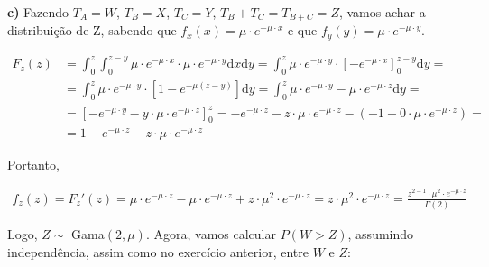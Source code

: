 \documentclass[12pt,letterpaper]{article}
\begin{document}
	\textbf{c)} Fazendo $T_A = W$, $T_B = X$, $T_C = Y$, $T_B+T_C=T_{B+C} = Z$, vamos achar a distribuição de Z, sabendo que $f_x(x) = \mu \cdot e^{-\mu \cdot x}$ e que $f_y(y) = \mu \cdot e^{-\mu \cdot y}$.
	
	\begin{equation*}
		\begin{split}
			F_z(z) & = \int_{0}^{z} \int_{0}^{z-y} \mu \cdot e^{-\mu \cdot x} \cdot \mu \cdot e^{-\mu \cdot y} \text{d}x \text{d}y = \int_{0}^{z}  \mu \cdot e^{-\mu \cdot y} \cdot \left[-e^{-\mu \cdot x}\right]_{0}^{z-y} \text{d}y = \\
			& = \int_{0}^{z}  \mu \cdot e^{-\mu \cdot y} \cdot \left[1 - e^{-\mu(z-y)}\right] \text{d}y = \int_{0}^{z}  \mu \cdot e^{-\mu \cdot y} - \mu \cdot e^{-\mu \cdot z} \text{d}y = \\
			& = \left[-e^{-\mu \cdot y} - y \cdot \mu \cdot e^{-\mu \cdot z}  \right]_{0}^{z} = -e^{-\mu \cdot z} - z \cdot \mu \cdot e^{-\mu \cdot z} - (-1 - 0 \cdot \mu \cdot e^{-\mu \cdot z}) = \\
			& = 1 -e^{-\mu \cdot z} - z \cdot \mu \cdot e^{-\mu \cdot z} 
		\end{split}
	\end{equation*}
	
	Portanto, 
	
	\begin{equation*}
		\begin{split}
			f_z(z) = F_z'(z) = \mu \cdot e^{-\mu \cdot z} - \mu \cdot e^{-\mu \cdot z} + z \cdot \mu^2 \cdot e^{-\mu \cdot z} = z \cdot \mu^2 \cdot e^{-\mu \cdot z} = \frac{z^{2-1} \cdot \mu^2 \cdot e^{-\mu \cdot z}}{\Gamma(2)}
		\end{split}
	\end{equation*}
	
	Logo, $Z\sim$ Gama$(2,\mu)$. Agora, vamos calcular $P(W>Z)$, assumindo independência, assim como no exercício anterior, entre $W$ e $Z$: 
	
\end{document}
